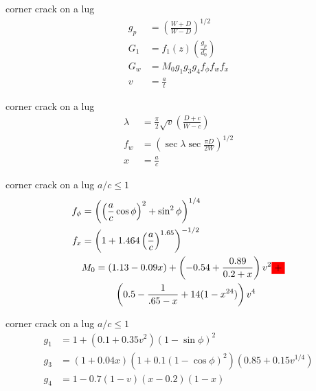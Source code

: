 \documentclass[
  letterpaper,
  ignorenonframetext,
  aspectratio=43,
  handout,
  12pt]{beamer}
\begin{document}
\begin{frame}{corner crack on a lug}
\protect\hypertarget{corner-crack-on-a-lug-2}{}
\[\begin{aligned}
  g_p &= \left(\frac{W+D}{W-D}\right)^{1/2}\\
  G_1 &= f_1(z) \left(\frac{g_p}{d_0}\right)\\
  G_w &= M_0 g_1 g_3 g_4 f_\phi f_w f_x\\
  v &= \frac{a}{t}
\end{aligned}\]
\end{frame}

\begin{frame}{corner crack on a lug}
\protect\hypertarget{corner-crack-on-a-lug-3}{}
\[\begin{aligned}
  \lambda &= \frac{\pi}{2} \sqrt{v} \left(\frac{D+c}{W-c}\right)\\
  f_w &= \left(\sec \lambda \sec \frac{\pi D}{2W}\right)^{1/2}\\
  x &= \frac{a}{c}
\end{aligned}\]
\end{frame}

\begin{frame}{corner crack on a lug \(a/c \le 1\)}
\protect\hypertarget{corner-crack-on-a-lug-ac-le-1}{}
\[
\begin{aligned}
  f_\phi &= \left(\left(\frac{a}{c}\cos \phi\right)^2 + \sin^2 \phi \right)^{1/4}\\
  f_x &= \left(1+1.464 \left(\frac{a}{c}\right)^{1.65}\right)^{-1/2}\\
  &\begin{aligned}
    M_0 &= (1.13 - 0.09x) + \left(-0.54 + \frac{0.89}{0.2 + x}\right)v^2 {    \colorbox{red}{+}} \\
    &\qquad \left(0.5 - \frac{1}{.65-x} + 14(1-x^{24})\right)v^4
  \end{aligned}
\end{aligned}\]
\end{frame}

\begin{frame}{corner crack on a lug \(a/c \le 1\)}
\protect\hypertarget{corner-crack-on-a-lug-ac-le-1-1}{}
\[\begin{aligned}
  g_1 &= 1 + \left(0.1 + 0.35 v^2\right)\left(1-\sin \phi\right)^2\\
  g_3 &= \left(1+0.04x\right)\left(1 + 0.1 \left(1-\cos \phi \right)^2\right)\left(0.85 + 0.15v ^{1/4}\right)\\
  g_4 &= 1 - 0.7 \left(1-v\right)\left(x - 0.2\right)\left(1-x\right)
\end{aligned}\]
\end{frame}
\end{document}
